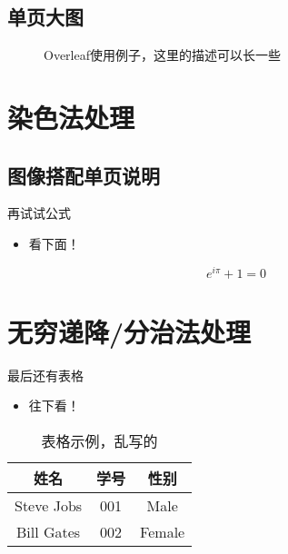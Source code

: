 \documentclass[
    fontset=fandol,
    xcolor=svgnames %
]{ctexbeamer}
\begin{document}
\subsection{单页大图}

\begin{frame}

    \begin{figure}
        \caption{Overleaf使用例子，这里的描述可以长一些}
        \label{fig:overleaf-example}
    \end{figure}

\end{frame}

\section{染色法处理}

\subsection{图像搭配单页说明}

\begin{frame}

    \begin{block}{再试试公式}
        \begin{itemize}
            \item 看下面！
        \end{itemize}
    \end{block}

    \begin{equation}
        e^{i\pi}+1=0
    \end{equation}

\end{frame}

\section{无穷递降/分治法处理}

\begin{frame}

    \begin{block}{最后还有表格}
        \begin{itemize}
            \item 往下看！
        \end{itemize}
    \end{block}

    \begin{table}
        \begin{tabular}{ccc}
            \hline
            姓名         & 学号  & 性别     \\
            \hline
            Steve Jobs & 001 & Male   \\
            Bill Gates & 002 & Female \\
            \hline
        \end{tabular}
        \caption{表格示例，乱写的}
        \label{fig:table-example}
    \end{table}

\end{frame}
\end{document}

